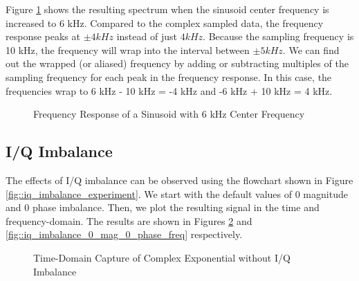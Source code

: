 \documentclass{article}
\begin{document}
Figure \ref{fig::freq_observations_real_6k_center_freq} shows the resulting spectrum when the sinusoid center frequency is increased to 6 kHz. Compared to the complex sampled data, the frequency response peaks at $\pm 4 kHz$ instead of just $4 kHz$. Because the sampling frequency is 10 kHz, the frequency will wrap into the interval between $\pm 5 kHz$. We can find out the wrapped (or aliased) frequency by adding or subtracting multiples of the sampling frequency for each peak in the frequency response. In this case, the frequencies wrap to 6 kHz - 10 kHz = -4 kHz and -6 kHz + 10 kHz = 4 kHz. 

\begin{figure}[H]
	\centerline{}
	\caption{Frequency Response of a Sinusoid with 6 kHz Center Frequency}
	\label{fig::freq_observations_real_6k_center_freq}
\end{figure}

\subsection{I/Q Imbalance}

The effects of I/Q imbalance can be observed using the flowchart shown in Figure \ref{fig::iq_imbalance_experiment}. We start with the default values of 0 magnitude and 0 phase imbalance. Then, we plot the resulting signal in the time and frequency-domain. The results are shown in Figures \ref{fig::iq_imbalance_0_mag_0_phase_time} and \ref{fig::iq_imbalance_0_mag_0_phase_freq} respectively. 

\begin{figure}[H]
	\centerline{}
	\caption{Time-Domain Capture of Complex Exponential without I/Q Imbalance}
	\label{fig::iq_imbalance_0_mag_0_phase_time}
\end{figure}
\end{document}

